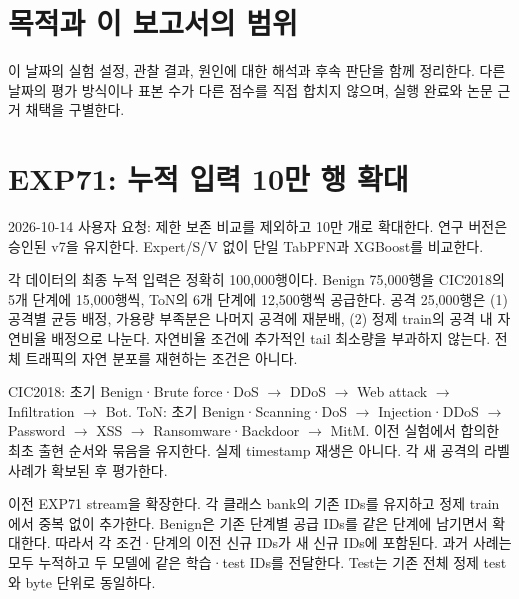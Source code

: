 




\section*{목적과 이 보고서의 범위}

이 날짜의 실험 설정, 관찰 결과, 원인에 대한 해석과 후속 판단을 함께 정리한다. 다른 날짜의 평가 방식이나 표본 수가 다른 점수를 직접 합치지 않으며, 실행 완료와 논문 근거 채택을 구별한다.


\section{EXP71: 누적 입력 10만 행 확대}
2026-10-14 사용자 요청: 제한 보존 비교를 제외하고 10만 개로 확대한다. 연구 버전은 승인된 v7을 유지한다. Expert/\allowbreak{}S/\allowbreak{}V 없이 단일 TabPFN과 XGBoost를 비교한다.

각 데이터의 최종 누적 입력은 정확히 100,000행이다. Benign 75,000행을 CIC2018의 5개 단계에 15,000행씩, ToN의 6개 단계에 12,500행씩 공급한다. 공격 25,000행은 (1) 공격별 균등 배정, 가용량 부족분은 나머지 공격에 재분배, (2) 정제 train의 공격 내 자연비율 배정으로 나눈다. 자연비율 조건에 추가적인 tail 최소량을 부과하지 않는다. 전체 트래픽의 자연 분포를 재현하는 조건은 아니다.

CIC2018: 초기 Benign·Brute force·DoS  \ensuremath{\rightarrow}  DDoS  \ensuremath{\rightarrow}  Web attack  \ensuremath{\rightarrow}  Infiltration  \ensuremath{\rightarrow}  Bot. ToN: 초기 Benign·Scanning·DoS  \ensuremath{\rightarrow}  Injection·DDoS  \ensuremath{\rightarrow}  Password  \ensuremath{\rightarrow}  XSS  \ensuremath{\rightarrow}  Ransomware·Backdoor  \ensuremath{\rightarrow}  MitM. 이전 실험에서 합의한 최초 출현 순서와 묶음을 유지한다. 실제 timestamp 재생은 아니다. 각 새 공격의 라벨 사례가 확보된 후 평가한다.

이전 EXP71 stream을 확장한다. 각 클래스 bank의 기존 IDs를 유지하고 정제 train에서 중복 없이 추가한다. Benign은 기존 단계별 공급 IDs를 같은 단계에 남기면서 확대한다. 따라서 각 조건·단계의 이전 신규 IDs가 새 신규 IDs에 포함된다. 과거 사례는 모두 누적하고 두 모델에 같은 학습·test IDs를 전달한다. Test는 기존 전체 정제 test와 byte 단위로 동일하다.

